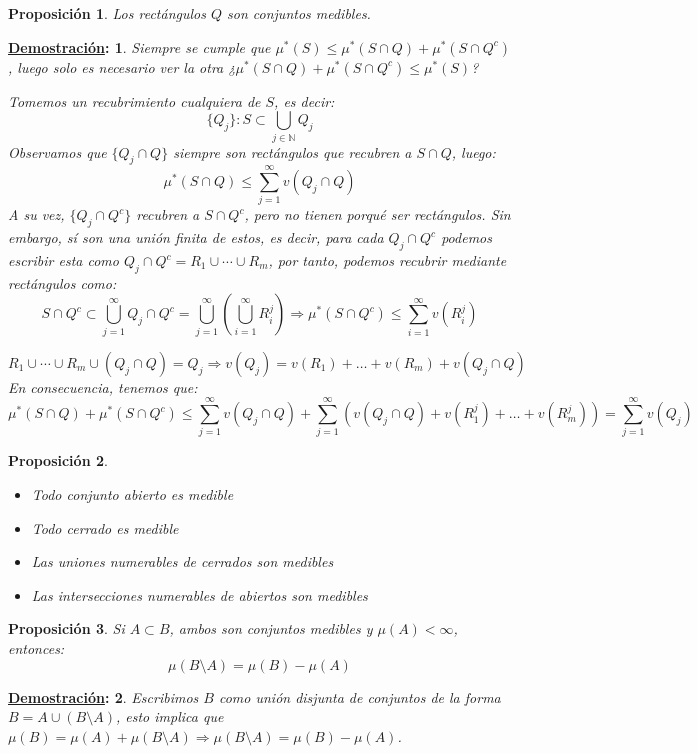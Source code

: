 \documentclass[10pt,a4paper,openright]{book}
\theoremstyle{break}
\newtheorem*{prop}{Proposición}
\newtheorem*{demo}{\underline{Demostración}:}
\begin{document}
\begin{prop}
Los rectángulos $Q$ son conjuntos medibles. 
\end{prop}
\begin{demo}
Siempre se cumple que $ \mu^*\left( S \right) \le \mu^*\left( S\cap Q \right) + \mu^*\left( S\cap Q^c \right)$, luego solo es necesario ver la otra ¿$ \mu^*\left( S\cap Q \right) + \mu^*\left( S\cap Q^c \right) \le \mu^*\left( S \right)$?

Tomemos un recubrimiento cualquiera de $S$, es decir:
$$\{Q_j\}: S \subset \bigcup_{j \in \mathbb{N}} Q_j$$
Observamos que $ \{Q_j \cap Q\} $ siempre son rectángulos que recubren a $S\cap Q$, luego:
$$\mu^*\left( S\cap Q \right) \le \sum_{j=1}^{\infty} v\left( Q_j \cap Q \right)$$
A su vez, $ \{Q_j \cap Q^c\}$ recubren a $S\cap Q^c$, pero no tienen porqué ser rectángulos. Sin embargo, sí son una unión finita de estos, es decir, para cada $Q_j \cap Q^c$ podemos escribir esta como $Q_j \cap Q^c = R_1 \cup \cdots \cup R_m$, por tanto, podemos recubrir mediante rectángulos como:
$$S \cap Q^c \subset \bigcup_{j=1}^\infty Q_j\cap Q^c = \bigcup_{j=1}^\infty \left(\bigcup_{i=1}^\infty  R_i^j \right)\Rightarrow \mu^*\left( S\cap Q^c \right) \le \sum_{i=1}^{\infty} v\left( R^j_i \right) $$

$$ R_1 \cup \cdots \cup R_m \cup \left( Q_j \cap Q \right) = Q_j \Rightarrow v\left( Q_j \right) = v\left( R_1 \right) +\ldots + v\left( R_m \right) + v\left( Q_j\cap Q \right) $$
En consecuencia, tenemos que:
$$\mu^*\left( S\cap Q \right) + \mu^*\left( S \cap Q^c \right) \le \sum_{j=1}^{\infty} v\left( Q_j \cap Q \right) + \sum_{j=1}^{\infty} \left( v\left( Q_j\cap Q \right) + v\left( R_1^j \right) +\ldots + v\left( R_m^j \right) \right) = \sum_{j=1}^{\infty} v\left( Q_j \right)$$
\end{demo}

\begin{prop}
\begin{itemize}
\item Todo conjunto abierto es medible
\item Todo cerrado es medible
\item Las uniones numerables de cerrados son medibles
\item Las intersecciones numerables de abiertos son medibles
\end{itemize}
\end{prop}

\begin{prop}
Si $A\subset B$, ambos son conjuntos medibles y $\mu(A) < \infty$, entonces:
$$\mu(B\setminus A) = \mu(B) - \mu(A)$$
\end{prop}
\begin{demo}
Escribimos $B$ como unión disjunta de conjuntos de la forma $B=A\cup (B\setminus A)$, esto implica que $\mu(B) = \mu(A) + \mu(B\setminus A) \Rightarrow \mu(B\setminus A) =  \mu(B) - \mu(A)$.
\end{demo}
\end{document}
